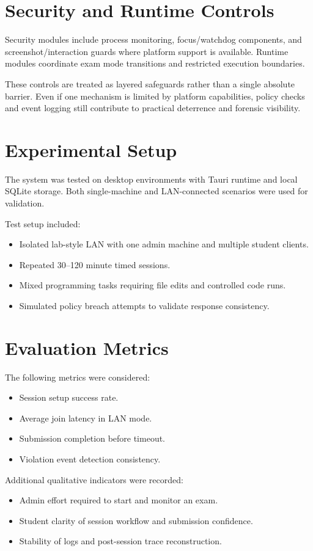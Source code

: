 \documentclass[12pt,a4paper]{report}
\begin{document}
	\section{Security and Runtime Controls}
	Security modules include process monitoring, focus/watchdog components, and screenshot/interaction guards where platform support is available. Runtime modules coordinate exam mode transitions and restricted execution boundaries.
	
	These controls are treated as layered safeguards rather than a single absolute barrier. Even if one mechanism is limited by platform capabilities, policy checks and event logging still contribute to practical deterrence and forensic visibility.
	
	\section{Experimental Setup}
	The system was tested on desktop environments with Tauri runtime and local SQLite storage. Both single-machine and LAN-connected scenarios were used for validation.
	
	Test setup included:
	\begin{itemize}
		\item Isolated lab-style LAN with one admin machine and multiple student clients.
		\item Repeated 30--120 minute timed sessions.
		\item Mixed programming tasks requiring file edits and controlled code runs.
		\item Simulated policy breach attempts to validate response consistency.
	\end{itemize}
	
	\section{Evaluation Metrics}
	The following metrics were considered:
	\begin{itemize}
		\item Session setup success rate.
		\item Average join latency in LAN mode.
		\item Submission completion before timeout.
		\item Violation event detection consistency.
	\end{itemize}
	
	Additional qualitative indicators were recorded:
	\begin{itemize}
		\item Admin effort required to start and monitor an exam.
		\item Student clarity of session workflow and submission confidence.
		\item Stability of logs and post-session trace reconstruction.
	\end{itemize}
	
\end{document}
